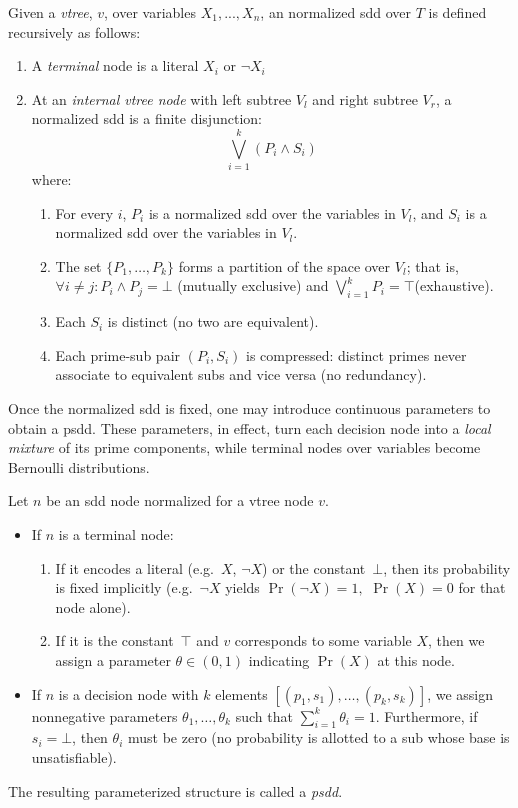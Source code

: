 \begin{definition}
Given a \emph{vtree}, $v$, over variables ${X_1, ... , X_n}$, an normalized \acrshort{sdd} over $T$ is defined recursively as follows:
\begin{enumerate}
    \item A \emph{terminal} node is a literal $X_i$ or $\neg X_i$
\item At an \emph{internal vtree node} with left subtree $V_l$ and right subtree $V_r$, a normalized \acrshort{sdd} is a finite disjunction: $$\bigvee_{i=1}^k \left( P_i \land S_i \right)$$ where:
\begin{enumerate}
    \item For every $i$,  $P_i$ is a normalized \acrshort{sdd} over the variables in $V_l$, and $S_i$ is a normalized \acrshort{sdd} over the variables in $V_l$.
    \item The set $\{P_1, \ldots, P_k\}$ forms a partition of the space over $V_l$; that is, $\forall i \neq j: P_i \land P_j = \bot$ (mutually exclusive) and $\bigvee_{i=1}^k P_i = \top$(exhaustive).
    \item Each $S_i$ is distinct (no two are equivalent).
    \item Each prime-sub pair $(P_i, S_i)$ is compressed: distinct primes never associate to equivalent subs and vice versa (no redundancy).
\end{enumerate}

\end{enumerate}
\end{definition}

Once the normalized \acrshort{sdd} is fixed, one may introduce continuous parameters to obtain a \acrshort{psdd}. These parameters, in effect, turn each decision node into a \emph{local mixture} of its prime components, while terminal nodes over variables become Bernoulli distributions.

\begin{definition}
\label{def:psdd-syntax}
Let $n$ be an \acrshort{sdd} node normalized for a vtree node $v$.
\begin{itemize}
\item If $n$ is a terminal node:
\begin{enumerate}
\item If it encodes a literal (e.g.\ $X$, $\neg X$) or the constant~$\bot$, then its probability is fixed implicitly (e.g.\ $\neg X$ yields $\Pr(\neg X)=1,$ $\Pr(X)=0$ for that node alone).
\item If it is the constant~$\top$ and $v$ corresponds to some variable $X$, then we assign a parameter $\theta\in(0,1)$ indicating $\Pr(X)$ at this node.
\end{enumerate}
\item If $n$ is a decision node with $k$ elements $[(p_1,s_1), \ldots, (p_k,s_k)]$, we assign nonnegative parameters $\theta_1,\ldots,\theta_k$ such that $\sum_{i=1}^k \theta_i=1$.  Furthermore, if $s_i = \bot$, then $\theta_i$ must be zero (no probability is allotted to a sub whose base is unsatisfiable).
\end{itemize}
The resulting parameterized structure is called a \emph{\acrshort{psdd}}.
\end{definition}

